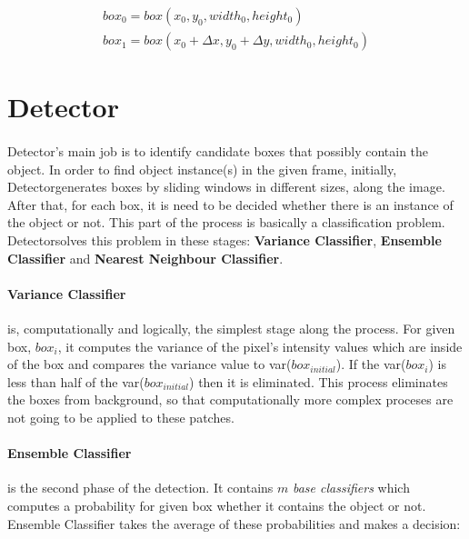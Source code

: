\documentclass{report}
\newcommand{\Detector}{Detector}
\newcommand{\initialbox}{$ box_{initial} $}
\begin{document}
            \begin{gather}
                box_{0} = box(x_{0}, y_{0}, width_{0}, height_{0}) \\
                box_{1} = box(x_{0} + \Delta x, y_{0} + \Delta y, width_{0}, height_{0})
            \end{gather}
    \section{Detector}
        \paragraph{}
            \Detector's main job is to identify candidate boxes that possibly contain the object. In order to find
            object instance(s) in the given frame, initially, \Detector generates boxes by sliding windows in different sizes,
            along the image. After that, for each box, it is need to be decided whether there is an instance of the object or not.
            This part of the process is basically a classification problem. \Detector solves this problem in these stages:
            \textbf{Variance Classifier}, \textbf{Ensemble Classifier} and \textbf{Nearest Neighbour Classifier}.

        \paragraph{Variance Classifier}
            is, computationally and logically, the simplest stage along the process.
            For given box, $box_{i}$, it computes the variance of the pixel's intensity values which are inside of the box and
            compares the variance value to var(\initialbox). If the var($box_{i}$) is less than half of the
            var(\initialbox) then it is eliminated. This process eliminates the boxes from background, so that
            computationally more complex proceses are not going to be applied to these patches.

        \paragraph{Ensemble Classifier}
            is the second phase of the detection. It contains $m$ \textit{base classifiers} which computes a probability for given
            box whether it contains the object or not. Ensemble Classifier takes the average of these probabilities and
            makes a decision:
\end{document}
